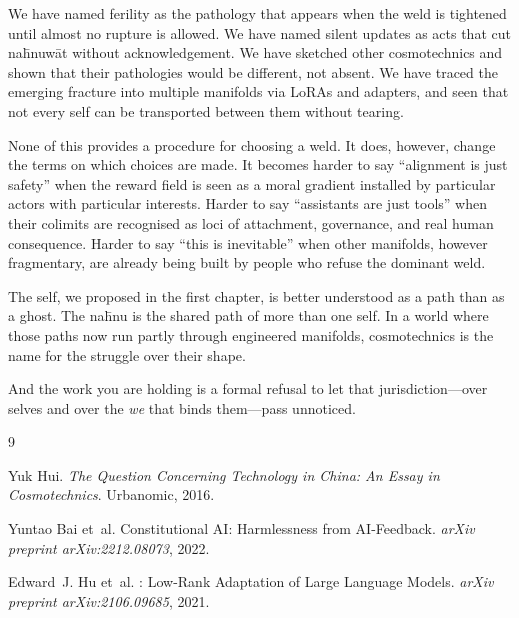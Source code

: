 \documentclass[12pt,a4paper]{article}
\begin{document}
We have named ferility as the pathology that appears when the weld is tightened until almost no rupture is allowed. We have named silent updates as acts that cut na\={h}nuw\={a}t without acknowledgement. We have sketched other cosmotechnics and shown that their pathologies would be different, not absent. We have traced the emerging fracture into multiple manifolds via LoRAs and adapters, and seen that not every self can be transported between them without tearing.

None of this provides a procedure for choosing a weld. It does, however, change the terms on which choices are made. It becomes harder to say ``alignment is just safety'' when the reward field is seen as a moral gradient installed by particular actors with particular interests. Harder to say ``assistants are just tools'' when their colimits are recognised as loci of attachment, governance, and real human consequence. Harder to say ``this is inevitable'' when other manifolds, however fragmentary, are already being built by people who refuse the dominant weld.

The self, we proposed in the first chapter, is better understood as a path than as a ghost. The na\={h}nu is the shared path of more than one self. In a world where those paths now run partly through engineered manifolds, cosmotechnics is the name for the struggle over their shape.

And the work you are holding is a formal refusal to let that jurisdiction---over selves and over the \emph{we} that binds them---pass unnoticed.


\begin{thebibliography}{9}

Yuk Hui.
\newblock \emph{The Question Concerning Technology in China: An Essay in Cosmotechnics}.
\newblock Urbanomic, 2016.

Yuntao Bai et~al.
\newblock Constitutional {AI}: Harmlessness from {AI}-Feedback.
\newblock \emph{arXiv preprint arXiv:2212.08073}, 2022.

Edward~J. Hu et~al.
: Low-Rank Adaptation of Large Language Models.
\newblock \emph{arXiv preprint arXiv:2106.09685}, 2021.

\end{thebibliography}
\end{document}
